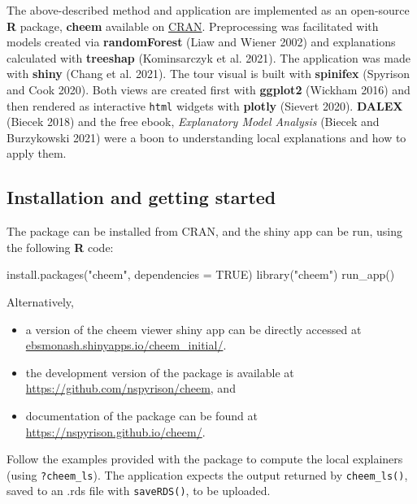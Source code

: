 \documentclass[
]{article}
\newenvironment{Shaded}{\begin{snugshade}}{\end{snugshade}}
\newcommand{\AttributeTok}[1]{\textcolor[rgb]{0.77,0.63,0.00}{#1}}
\newcommand{\ConstantTok}[1]{\textcolor[rgb]{0.00,0.00,0.00}{#1}}
\newcommand{\FunctionTok}[1]{\textcolor[rgb]{0.00,0.00,0.00}{#1}}
\newcommand{\NormalTok}[1]{#1}
\newcommand{\StringTok}[1]{\textcolor[rgb]{0.31,0.60,0.02}{#1}}
\providecommand{\tightlist}{%
  \setlength{\itemsep}{0pt}\setlength{\parskip}{0pt}}
\begin{document}
The above-described method and application are implemented as an open-source \textbf{R} package, \textbf{cheem} available on \href{https://CRAN.R-project.org/package=cheem}{CRAN}. Preprocessing was facilitated with models created via \textbf{randomForest} (Liaw and Wiener 2002) and explanations calculated with \textbf{treeshap} (Kominsarczyk et al. 2021). The application was made with \textbf{shiny} (Chang et al. 2021). The tour visual is built with \textbf{spinifex} (Spyrison and Cook 2020). Both views are created first with \textbf{ggplot2} (Wickham 2016) and then rendered as interactive \texttt{html} widgets with \textbf{plotly} (Sievert 2020). \textbf{DALEX} (Biecek 2018) and the free ebook, \emph{Explanatory Model Analysis} (Biecek and Burzykowski 2021) were a boon to understanding local explanations and how to apply them.

\hypertarget{installation-and-getting-started}{%
\subsection{Installation and getting started}\label{installation-and-getting-started}}

The package can be installed from CRAN, and the shiny app can be run, using the following \textbf{R} code:

\begin{Shaded}
\begin{Highlighting}[]
\FunctionTok{install.packages}\NormalTok{(}\StringTok{"cheem"}\NormalTok{, }\AttributeTok{dependencies =} \ConstantTok{TRUE}\NormalTok{)}
\FunctionTok{library}\NormalTok{(}\StringTok{"cheem"}\NormalTok{)}
\FunctionTok{run\_app}\NormalTok{()}
\end{Highlighting}
\end{Shaded}

Alternatively,

\begin{itemize}
\tightlist
\item
  a version of the cheem viewer shiny app can be directly accessed at \href{https://ebsmonash.shinyapps.io/cheem_initial/}{ebsmonash.shinyapps.io/cheem\_initial/}.
\item
  the development version of the package is available at \url{https://github.com/nspyrison/cheem}, and
\item
  documentation of the package can be found at \url{https://nspyrison.github.io/cheem/}.
\end{itemize}

Follow the examples provided with the package to compute the local explainers (using \texttt{?cheem\_ls}). The application expects the output returned by \texttt{cheem\_ls()}, saved to an .rds file with \texttt{saveRDS()}, to be uploaded.
\end{document}
